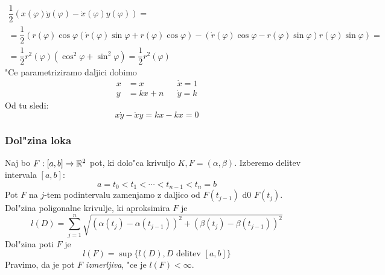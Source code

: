 \begin{multline*}
\dfrac{1}{2} (x(\varphi) \dot{y} (\varphi) - \dot{x}(\varphi) y(\varphi)) = \\
=\dfrac{1}{2} (r(\varphi) \cos \varphi (\dot{r}(\varphi) \sin \varphi + r(\varphi) \cos \varphi) - (\dot{r}(\varphi) \cos \varphi - r(\varphi) \sin \varphi) r(\varphi) \sin \varphi) = \\
= \dfrac{1}{2} r^2 (\varphi) (\cos^2 \varphi + \sin^2 \varphi) = \dfrac{1}{2} r^2(\varphi)
\end{multline*}
"Ce parametriziramo daljici dobimo
\begin{align*}
x &= x  && \dot{x} = 1 \\
y &= kx + n && \dot{y} = k
\end{align*}
Od tu sledi:
\begin{equation*}
x \dot{y} - \dot{x}y = kx - kx = 0
\end{equation*}

\subsubsection{Dol"zina loka}
 Naj bo $F: [a, b] \to \mathbb{R}^2$ pot, ki dolo"ca krivuljo $K, F= (\alpha, \beta)$. Izberemo delitev intervala $[a, b]$:
\begin{equation*}
a = t_0 < t_1 < \cdots < t_{n-1} < t_n = b
\end{equation*}
Pot $F$ na $j$-tem podintervalu zamenjamo z daljico od $F(t_{j-1})$ d0 $F(t_j)$. Dol"zina poligonalne krivulje, ki aproksimira $F$ je
\begin{equation*}
l(D) = \sum_{j=1}^{n} \sqrt{\left( \alpha(t_j) - \alpha(t_{j-1}) \right)^2 + (\beta(t_j) - \beta(t_{j-1}))^2}
\end{equation*}
Dol"zina poti $F$ je
\begin{equation*}
l(F) = \sup \{l(D), \text{$D$ delitev $[a, b]$}\}
\end{equation*}
Pravimo, da je pot $F$ \emph{izmerljiva}, "ce je $l(F) < \infty$.

